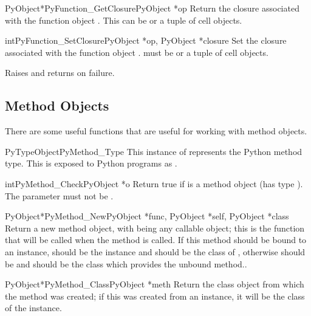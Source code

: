 \begin{cfuncdesc}{PyObject*}{PyFunction_GetClosure}{PyObject *op}
  Return the closure associated with the function object .
  This can be \NULL{} or a tuple of cell objects.
\end{cfuncdesc}

\begin{cfuncdesc}{int}{PyFunction_SetClosure}{PyObject *op,
                                              PyObject *closure}
  Set the closure associated with the function object .
   must be  or a tuple of cell objects.

  Raises  and returns  on failure.
\end{cfuncdesc}


\subsection{Method Objects \label{method-objects}}

There are some useful functions that are useful for working with
method objects.

\begin{cvardesc}{PyTypeObject}{PyMethod_Type}
  This instance of  represents the Python method
  type.  This is exposed to Python programs as .
\end{cvardesc}

\begin{cfuncdesc}{int}{PyMethod_Check}{PyObject *o}
  Return true if  is a method object (has type
  ).  The parameter must not be \NULL{}.
\end{cfuncdesc}

\begin{cfuncdesc}{PyObject*}{PyMethod_New}{PyObject *func,
                                           PyObject *self, PyObject *class}
  Return a new method object, with  being any callable
  object; this is the function that will be called when the method is
  called.  If this method should be bound to an instance, 
  should be the instance and  should be the class of
  , otherwise  should be \NULL{} and 
  should be the class which provides the unbound method..
\end{cfuncdesc}

\begin{cfuncdesc}{PyObject*}{PyMethod_Class}{PyObject *meth}
  Return the class object from which the method  was
  created; if this was created from an instance, it will be the class
  of the instance.
\end{cfuncdesc}

